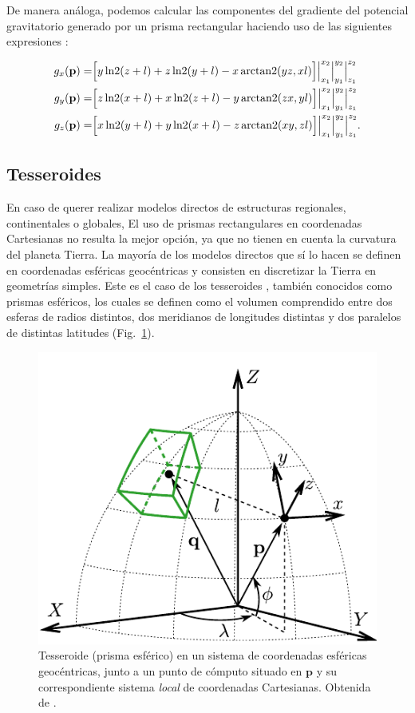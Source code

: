 De manera análoga, podemos calcular las componentes del gradiente del potencial
gravitatorio generado por un prisma rectangular haciendo uso de las siguientes
expresiones \citep{nagy2000,nagy2002}:

\begin{align}
    g_x(\mathbf{p}) =&
        \Big[
            y \operatorname{ln2}(z + l) + z \operatorname{ln2}(y + l)  - x \operatorname{arctan2}(yz, xl)
        \Big]
        \Big|_{x_1}^{x_2}
        \Big|_{y_1}^{y_2}
        \Big|_{z_1}^{z_2} \\
    g_y(\mathbf{p}) =&
        \Big[
            z \operatorname{ln2}(x + l) + x \operatorname{ln2}(z + l)  - y \operatorname{arctan2}(zx, yl)
        \Big]
        \Big|_{x_1}^{x_2}
        \Big|_{y_1}^{y_2}
        \Big|_{z_1}^{z_2} \\
    g_z(\mathbf{p}) =&
        \Big[
            x \operatorname{ln2}(y + l) + y \operatorname{ln2}(x + l) - z \operatorname{arctan2}(xy, zl)
        \Big]
        \Big|_{x_1}^{x_2}
        \Big|_{y_1}^{y_2}
        \Big|_{z_1}^{z_2}.
\end{align}


\subsection{Tesseroides}

En caso de querer realizar modelos directos de estructuras regionales,
continentales o globales,
El uso de prismas rectangulares en coordenadas Cartesianas no resulta la mejor
opción, ya que no tienen en cuenta la curvatura del planeta Tierra.
La mayoría de los modelos directos que sí lo hacen se definen en coordenadas
esféricas geocéntricas y consisten en discretizar la Tierra en geometrías
simples.
Este es el caso de los tesseroides \citep{anderson1976}, también conocidos como
prismas esféricos, los cuales se definen como el volumen comprendido entre dos
esferas de radios distintos, dos meridianos de longitudes distintas y dos
paralelos de distintas latitudes (Fig.~\ref{fig:tesseroid}).

\begin{figure}
    \centering
    \includegraphics[width=0.7\linewidth]{figs/tesseroid-coord-sys.pdf}
    \caption{
        Tesseroide (prisma esférico) en un sistema de coordenadas esféricas
        geocéntricas, junto a un punto de cómputo situado en $\mathbf{p}$ y su
        correspondiente sistema \emph{local} de coordenadas Cartesianas.
        Obtenida de \citet{uieda2015}.
    }
    \label{fig:tesseroid}
\end{figure}

